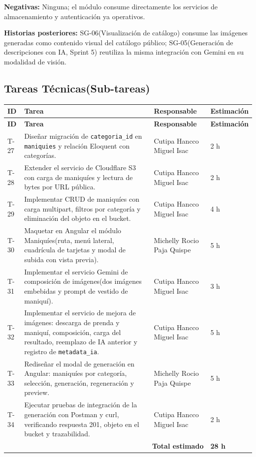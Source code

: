 \documentclass[12pt,a4paper]{article}
\begin{document}
\textbf{Negativas:} Ninguna; el módulo consume directamente los servicios de almacenamiento y autenticación ya operativos.

\textbf{Historias posteriores:} SG-06(Visualización de catálogo) consume las imágenes generadas como contenido visual del catálogo público; SG-05(Generación de descripciones con IA, Sprint 5) reutiliza la misma integración con Gemini en su modalidad de visión.

\subsection*{Tareas Técnicas(Sub-tareas)}

{\small
\begin{longtable}{p{1.2cm} p{7.9cm} p{4.2cm} p{1.7cm}}
\toprule
\textbf{ID} & \textbf{Tarea} & \textbf{Responsable} & \textbf{Estimación} \\
\midrule
\endfirsthead

\toprule
\textbf{ID} & \textbf{Tarea} & \textbf{Responsable} & \textbf{Estimación} \\
\midrule
\endhead

\bottomrule
\endlastfoot

T-27 & Diseñar migración de \texttt{categoria\_id} en \texttt{maniquies} y relación Eloquent con categorías. & Cutipa Hancco Miguel Isac & 2 h \\
T-28 & Extender el servicio de Cloudflare S3 con carga de maniquíes y lectura de bytes por URL pública. & Cutipa Hancco Miguel Isac & 2 h \\
T-29 & Implementar CRUD de maniquíes con carga multipart, filtros por categoría y eliminación del objeto en el bucket. & Cutipa Hancco Miguel Isac & 4 h \\
T-30 & Maquetar en Angular el módulo Maniquíes(ruta, menú lateral, cuadrícula de tarjetas y modal de subida con vista previa). & Michelly Rocio Paja Quispe & 5 h \\
T-31 & Implementar el servicio Gemini de composición de imágenes(dos imágenes embebidas y prompt de vestido de maniquí). & Cutipa Hancco Miguel Isac & 3 h \\
T-32 & Implementar el servicio de mejora de imágenes: descarga de prenda y maniquí, composición, carga del resultado, reemplazo de IA anterior y registro de \texttt{metadata\_ia}. & Cutipa Hancco Miguel Isac & 5 h \\
T-33 & Rediseñar el modal de generación en Angular: maniquíes por categoría, selección, generación, regeneración y preview. & Michelly Rocio Paja Quispe & 5 h \\
T-34 & Ejecutar pruebas de integración de la generación con Postman y curl, verificando respuesta 201, objeto en el bucket y trazabilidad. & Cutipa Hancco Miguel Isac & 2 h \\

\midrule
\multicolumn{3}{r}{\textbf{Total estimado}} & \textbf{28 h} \\

\end{longtable}
}
\end{document}
